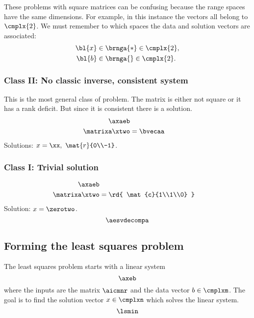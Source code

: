 These problems with square matrices can be confusing because the range spaces have the same dimensions. For example, in this instance the vectors all belong to $\cmplx{2}$. We must remember to which spaces the data and solution vectors are associated:
%
\begin{equation}
  \begin{split}
    {\bl{ x }} &\in \brnga{*} \in \cmplx{2}, \\
    {\bl{ b }} &\in \brnga{} \in \cmplx{2}.
  \end{split}
\end{equation}



\subsubsection{Class II: No classic inverse, consistent system}
This is the most general class of problem. The matrix is either not square or it has a rank deficit. But since it is consistent there is a solution.
\begin{equation}
  \begin{split}
    \axaeb \\
    \matrixa \xtwo &= \bvecaa
  \end{split}
\end{equation}
Solutions: $x = \xx, \ \mat{r}{0\\-1}$.


\subsubsection{Class I: Trivial solution}
\begin{equation}
  \begin{split}
    \axaeb \\
    \matrixa \xtwo &= {\rd{ \mat{c}{1\\1\\0} }}
  \end{split}
\end{equation}
Solution: $x = \zerotwo$.
\begin{equation}
  \aesvdecompa
\end{equation}


\subsection{Forming the least squares problem}
The least squares problem starts with a linear system
\begin{equation}
  \axeb 
\end{equation}
where the inputs are the matrix $\aicmnr$ and the data vector $b\in \cmplxm$. The goal is to find the solution vector $x\in \cmplxn$ which solves the linear system.
\begin{equation}
  \lsmin 
  \label{eq:lsmin}
\end{equation}


